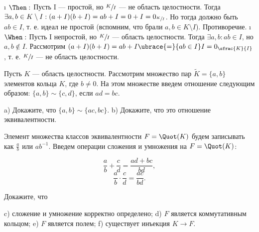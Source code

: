 \begin{solution}

\begin{itemize}
\tightlist
\i
  \(\Then:\)
  Пусть I --- простой, но \(\sfrac{K}{I}\) --- не область целостности. Тогда \(\exists a, b \in K\setminus I: (a+I)(b+I) = ab+I = 0+I = 0_{\sfrac{K}{I}}\). Но тогда должно быть \(ab \in I\), т. е. идеал не простой (вспомним, что брали $a, b \in K\setminus I$). Противоречие.
\i
  \(\When:\)
  Пусть I непростой, но $\sfrac{K}{I}$ --- область целостности. Тогда \(\exists a, b: ab \in I\), но \(a, b \not\in I\). Рассмотрим \((a+I)(b+I) = ab + I \ubrace{=}{ab \in I} I = 0_{\sfrac{K}{I}}\), т. е. $\sfrac{K}{I}$ --- не область целостности.
\end{itemize}

\end{solution}

\begin{problem}[23(5.1, 5.2)]
Пусть $K$ --- область целостности. Рассмотрим  множество пар $\tilde{K}=\{a,b\}$ элементов кольца $K$, где $b\neq 0$. На этом множестве введем отношение следующим образом: $\{a,b\} \sim \{c,d\}$, если $ad=bc$.

a) Докажите, что $\{a,b\} \sim \{ac,bc\}$. 
b) Докажите, что это отношение эквивалентности.

Элемент множества классов эквивалентности $F = \Quot(K)$ будем записывать как $\frac{a}{b}$ или $ab^{-1}$. Введем операции сложения и умножения на $F = \Quot(K)$:

$$\frac{a}{b} + \frac{c}{d} = \frac{ad+bc}{bd},$$
$$\frac{a}{b} \cdot \frac{c}{d} = \frac{ac}{bd}.$$

Докажите, что

c) сложение и умножение корректно определено;
d) $F$ является коммутативным кольцом;
e) $F$ является полем;
f) существует инъекция $K \to F$.

\end{problem}

